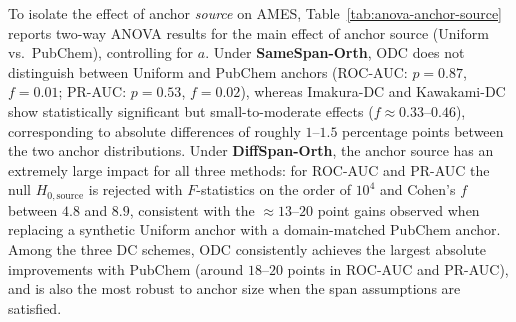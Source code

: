 \documentclass[final,3p,times]{elsarticle}
\theoremstyle{plain}
\begin{document}
To isolate the effect of anchor \emph{source} on AMES, Table~\ref{tab:anova-anchor-source} reports two-way ANOVA results for the main effect of anchor source (Uniform vs.\ PubChem), controlling for $a$. Under \textbf{SameSpan-Orth}, ODC does not distinguish between Uniform and PubChem anchors (ROC-AUC: $p=0.87$, $f=0.01$; PR-AUC: $p=0.53$, $f=0.02$), whereas Imakura-DC and Kawakami-DC show statistically significant but small-to-moderate effects ($f\approx 0.33$--$0.46$), corresponding to absolute differences of roughly $1$--$1.5$ percentage points between the two anchor distributions. Under \textbf{DiffSpan-Orth}, the anchor source has an extremely large impact for all three methods: for ROC-AUC and PR-AUC the null $H_{0,\text{source}}$ is rejected with $F$-statistics on the order of $10^4$ and Cohen's $f$ between $4.8$ and $8.9$, consistent with the $\approx 13$--$20$ point gains observed when replacing a synthetic Uniform anchor with a domain-matched PubChem anchor. Among the three DC schemes, ODC consistently achieves the largest absolute improvements with PubChem (around $18$--$20$ points in ROC-AUC and PR-AUC), and is also the most robust to anchor size when the span assumptions are satisfied.
\end{document}
